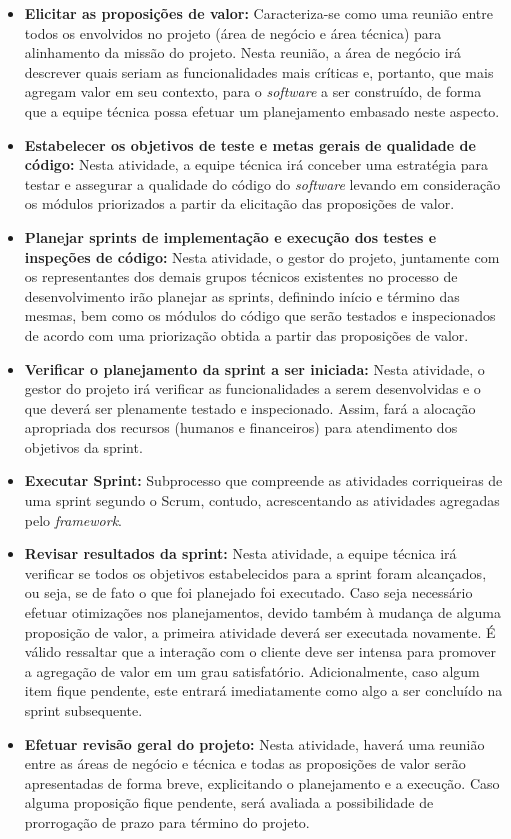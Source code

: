 \begin{itemize}
	\item \textbf{Elicitar as proposições de valor:} Caracteriza-se como uma reunião entre todos os envolvidos no projeto (área de negócio e área técnica) para alinhamento da missão do projeto. Nesta reunião, a área de negócio irá descrever quais seriam as funcionalidades mais críticas e, portanto, que mais agregam valor em seu contexto, para o \textit{software} a ser construído, de forma que a equipe técnica possa efetuar um planejamento embasado neste aspecto.

	\item \textbf{Estabelecer os objetivos de teste e metas gerais de qualidade de código:} Nesta atividade, a equipe técnica irá conceber uma estratégia para testar e assegurar a qualidade do código do \textit{software} levando em consideração os módulos priorizados a partir da elicitação das proposições de valor.

	\item \textbf{Planejar sprints de implementação e execução dos testes e inspeções de código:} Nesta atividade, o gestor do projeto, juntamente com os representantes dos demais grupos técnicos existentes no processo de desenvolvimento irão planejar as sprints, definindo início e término das mesmas, bem como os módulos do código que serão testados e inspecionados de acordo com uma priorização obtida a partir das proposições de valor.

	\item \textbf{Verificar o planejamento da sprint a ser iniciada:} Nesta atividade, o gestor do projeto irá verificar as funcionalidades a serem desenvolvidas e o que deverá ser plenamente testado e inspecionado. Assim, fará a alocação apropriada dos recursos (humanos e financeiros) para atendimento dos objetivos da sprint.

	\item \textbf{Executar Sprint:} Subprocesso que compreende as atividades corriqueiras de uma sprint segundo o Scrum, contudo, acrescentando as atividades agregadas pelo \textit{framework}.

	\item \textbf{Revisar resultados da sprint:} Nesta atividade, a equipe técnica irá verificar se todos os objetivos estabelecidos para a sprint foram alcançados, ou seja, se de fato o que foi planejado foi executado. Caso seja necessário efetuar otimizações nos planejamentos, devido também à mudança de alguma proposição de valor, a primeira atividade deverá ser executada novamente. É válido ressaltar que a interação com o cliente deve ser intensa para promover a agregação de valor em um grau satisfatório. Adicionalmente, caso algum item fique pendente, este entrará imediatamente como algo a ser concluído na sprint subsequente.

	\item \textbf{Efetuar revisão geral do projeto:} Nesta atividade, haverá uma reunião entre as áreas de negócio e técnica e todas as proposições de valor serão apresentadas de forma breve, explicitando o planejamento e a execução. Caso alguma proposição fique pendente, será avaliada a possibilidade de prorrogação de prazo para término do projeto.
\end{itemize}

